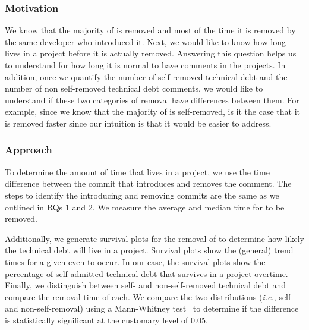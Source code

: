 \subsubsection*{Motivation} We know that the majority of \SATD is removed and most of the time it is removed by the same developer who introduced it. Next, we would like to know how long \SATD lives in a project before it is actually removed. Answering this question helps us to understand for how long it is normal to have \SATD comments in the projects. In addition, once we quantify the number of self-removed technical debt and the number of non self-removed technical debt comments, we would like to understand if these two categories of removal have differences between them. For example, since we know that the majority of \SATD is self-removed, is it the case that it is removed faster since our intuition is that it would be easier to address. 

\subsubsection*{Approach} To determine the amount of time that \SATD lives in a project, we use the time difference between the commit that introduces and removes the \SATD comment. The steps to identify the \SATD introducing and removing commits are the same as we outlined in RQs 1 and 2. We measure the average and median time for \SATD to be removed. 

Additionally, we generate survival plots for the removal of \SATD to determine how likely the technical debt will live in a project. Survival plots show the (general) trend times for a given even to occur. In our case, the survival plots show the  percentage of self-admitted technical debt that survives in a project overtime. Finally, we distinguish between self- and non-self-removed technical debt and compare the removal time of each. We compare the two distributions (\emph{i.e.}, self- and non-self-removal) using a Mann-Whitney test~\cite{mann1947test} to determine if the difference is statistically significant at the customary level of 0.05.

